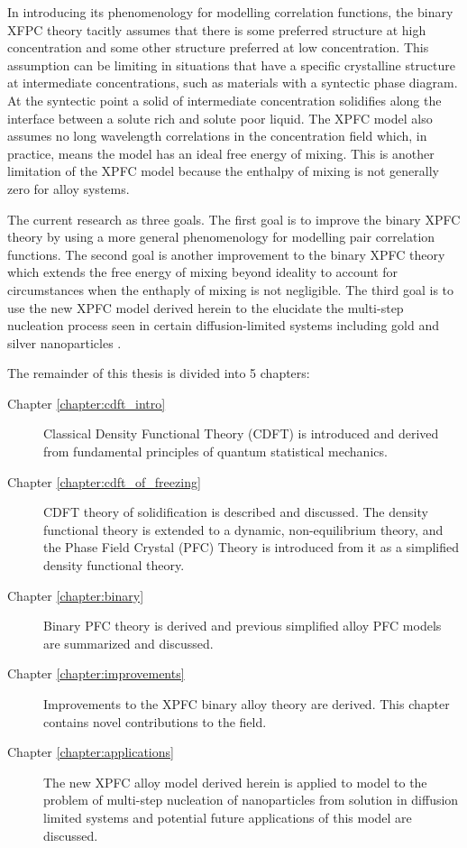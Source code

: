 
In introducing its phenomenology for modelling correlation functions, the
binary XFPC theory tacitly assumes that there is some preferred structure at
high concentration and some other structure preferred at low concentration.
This assumption can be limiting in situations that have a specific crystalline
structure at intermediate concentrations, such as materials with a syntectic
phase diagram. At the syntectic point a solid of intermediate concentration
solidifies along the interface between a solute rich and solute poor liquid.
The XPFC model also assumes no long wavelength correlations in the
concentration field which, in practice, means the model has an ideal free
energy of mixing.  This is another limitation of the XPFC model because the
enthalpy of mixing is not generally zero for alloy systems.


The current research as three goals. The first goal is to improve the binary
XPFC theory by using a more general phenomenology for modelling pair
correlation functions. The second goal is another improvement to the binary
XPFC theory which extends the free energy of mixing beyond ideality to account
for circumstances when the enthaply of mixing is not negligible. The third goal
is to use the new XPFC model derived herein to the elucidate the multi-step
nucleation process seen in certain diffusion-limited systems including gold and
silver nanoparticles \cite{LOH17}.


The remainder of this thesis is divided into 5 chapters:
%
\begin{description}
    \item [Chapter \ref{chapter:cdft_intro}] { Classical Density Functional
        Theory (CDFT) is introduced and derived from fundamental principles of
        quantum statistical mechanics.
    }
    \item [Chapter \ref{chapter:cdft_of_freezing}] { CDFT theory of
        solidification is described and discussed. The density functional
        theory is extended to a dynamic, non-equilibrium theory, and the Phase
        Field Crystal (PFC) Theory is introduced from it as a simplified
        density functional theory.
    }
    \item [Chapter \ref{chapter:binary}] {Binary PFC theory is derived and
        previous simplified alloy PFC models are summarized and discussed.
    }
    \item [Chapter \ref{chapter:improvements}] {Improvements to the XPFC binary
        alloy theory are derived. This chapter contains novel contributions to
        the field.
    }
    \item [Chapter \ref{chapter:applications}] {The new XPFC alloy model
        derived herein is applied to model to the problem of multi-step
        nucleation of nanoparticles from solution in diffusion limited systems
        and potential future applications of this model are discussed.
    } 
\end{description}
%
